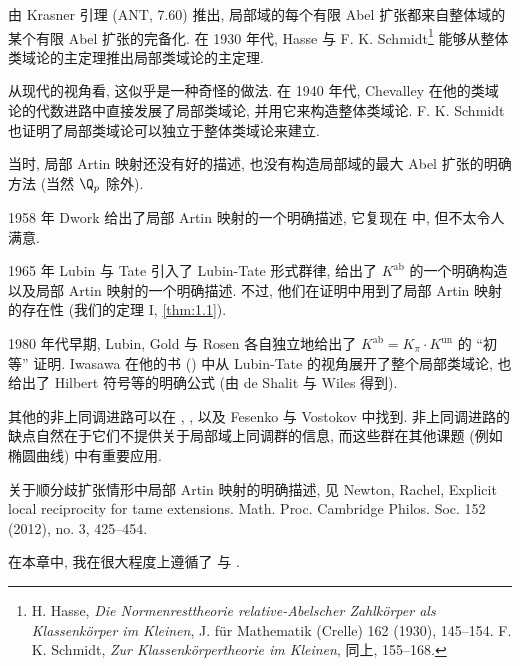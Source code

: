 \begin{NOTES}
由 Krasner 引理 (ANT, 7.60) 推出, 局部域的每个有限 Abel 扩张都来自整体域的某个有限 Abel 扩张的完备化. 在 1930 年代, Hasse 与 F. K. Schmidt\footnote{H. Hasse, \emph{Die Normenresttheorie relative-Abelscher Zahlkörper als Klassenkörper im Kleinen}, J. für Mathematik (Crelle) 162 (1930), 145–154. F. K. Schmidt, \emph{Zur Klassenkörpertheorie im Kleinen}, 同上, 155–168.} 能够从整体类域论的主定理推出局部类域论的主定理.

从现代的视角看, 这似乎是一种奇怪的做法. 在 1940 年代, Chevalley 在他的类域论的代数进路中直接发展了局部类域论, 并用它来构造整体类域论. F. K. Schmidt 也证明了局部类域论可以独立于整体类域论来建立.

当时, 局部 Artin 映射还没有好的描述, 也没有构造局部域的最大 Abel 扩张的明确方法 (当然 $\Q_p$ 除外).

1958 年 Dwork 给出了局部 Artin 映射的一个明确描述, 它复现在 \cite{Serre1962} 中, 但不太令人满意.

1965 年 Lubin 与 Tate 引入了 Lubin-Tate 形式群律, 给出了 $K^{\mathrm{ab}}$ 的一个明确构造以及局部 Artin 映射的一个明确描述. 不过, 他们在证明中用到了局部 Artin 映射的存在性 (我们的定理 I, \ref{thm:1.1}).

1980 年代早期, Lubin, Gold 与 Rosen 各自独立地给出了 $K^{\mathrm{ab}}=K_\pi\cdot K^{\mathrm{un}}$ 的 ``初等'' 证明. Iwasawa 在他的书 (\cite{Iwasawa1986}) 中从 Lubin-Tate 的视角展开了整个局部类域论, 也给出了 Hilbert 符号等的明确公式 (由 de Shalit 与 Wiles 得到).

其他的非上同调进路可以在 \cite{Hazewinkel1975}, \cite{Neukirch1986}, 以及 Fesenko 与 Vostokov \citeyear{FesenkoVostokov1993} 中找到. 非上同调进路的缺点自然在于它们不提供关于局部域上同调群的信息, 而这些群在其他课题 (例如椭圆曲线) 中有重要应用.

关于顺分歧扩张情形中局部 Artin 映射的明确描述, 见 Newton, Rachel, Explicit local reciprocity for tame extensions. Math. Proc. Cambridge Philos. Soc. 152 (2012), no. 3, 425--454.

在本章中, 我在很大程度上遵循了 \cite{Serre1962} 与 \cite{Serre1967a}.
\end{NOTES}
